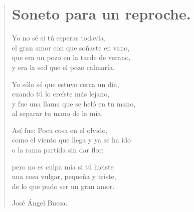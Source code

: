 \documentclass[11pt, portrait, twoside, notitlepage, openright]{book}
\begin{document}
\newpage
\begin{verse}
\begin{center}
\section{Soneto para un reproche.}
\end{center}
Yo no sé si tú esperas todavía,\\
el gran amor con que soñaste en vano,\\
que era un pozo en la tarde de verano,\\
y era la sed que el pozo calmaría.
\newline

Yo sólo sé que estuvo cerca un día,\\
cuando tú lo creíste más lejano,\\
y fue una llama que se heló en tu mano,\\
al separar tu mano de la mía.
\newline

Así fue: Poca cosa en el olvido,\\
como el viento que llega y ya se ha ido\\
o la rama partida sin dar flor;
\newline

pero no es culpa mía si tú hiciste\\
una cosa vulgar, pequeña y triste,\\
de lo que pudo ser un gran amor.
\newline

José Ángel Buesa.
\end{verse}
\end{document}
